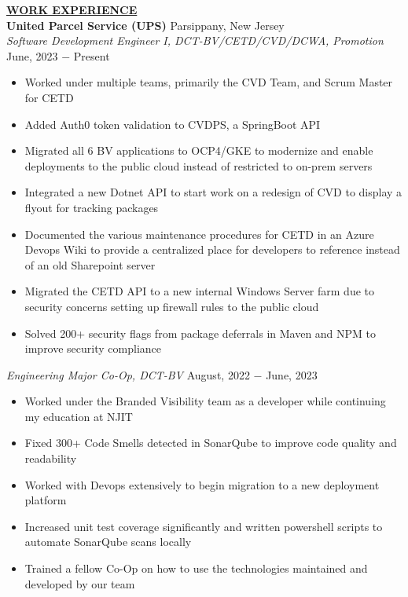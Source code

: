 \documentclass{article}
\begin{document}
% 
%
\noindent \textbf{\underline{WORK EXPERIENCE}} \\
\noindent \textbf{United Parcel Service (UPS)} \hfill Parsippany, New Jersey \\
\textit{Software Development Engineer I, DCT-BV/CETD/CVD/DCWA, Promotion} \hfill June, 2023 $-$ Present
\begin{itemize}[noitemsep,nolistsep,leftmargin=*]
\item {Worked under multiple teams, primarily the CVD Team, and Scrum Master for CETD}
\item {Added Auth0 token validation to CVDPS, a SpringBoot API}
\item {Migrated all 6 BV applications to OCP4/GKE to modernize and enable deployments to the public cloud instead of restricted to on-prem servers}
\item {Integrated a new Dotnet API to start work on a redesign of CVD to display a flyout for tracking packages}
\item {Documented the various maintenance procedures for CETD in an Azure Devops Wiki to provide a centralized place for developers to reference instead of an old Sharepoint server}
\item {Migrated the CETD API to a new internal Windows Server farm due to security concerns setting up firewall rules to the public cloud}
\item {Solved 200+ security flags from package deferrals in Maven and NPM to improve security compliance}\\

\end{itemize}\textit{Engineering Major Co-Op, DCT-BV} \hfill August, 2022 $-$ June, 2023
\begin{itemize}[noitemsep,nolistsep,leftmargin=*]
\item {Worked under the Branded Visibility team as a developer while continuing my education at NJIT}
\item {Fixed 300+ Code Smells detected in SonarQube to improve code quality and readability}
\item {Worked with Devops extensively to begin migration to a new deployment platform}
\item {Increased unit test coverage significantly and written powershell scripts to automate SonarQube scans locally}
\item {Trained a fellow Co-Op on how to use the technologies maintained and developed by our team}\\
\end{itemize}
\end{document}

